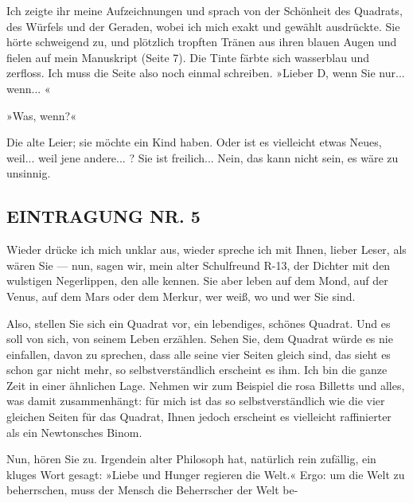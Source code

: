 Ich zeigte ihr meine Aufzeichnungen und sprach von der Schönheit
des Quadrats, des Würfels und der Geraden, wobei ich mich exakt und
gewählt ausdrückte. Sie hörte schweigend zu, und plötzlich tropften
Tränen aus ihren blauen Augen und fielen auf mein Manuskript (Seite
7). Die Tinte färbte sich wasserblau und zerfloss. Ich muss die
Seite also noch einmal schreiben. »Lieber D, wenn Sie nur...
wenn... «

»Was, wenn?«

Die alte Leier; sie möchte ein Kind haben. Oder ist es vielleicht
etwas Neues, weil... weil jene andere... ? Sie ist freilich...
Nein, das kann nicht sein, es wäre zu unsinnig.

\subsection{EINTRAGUNG NR. 5}

Wieder drücke ich mich unklar aus, wieder spreche ich mit Ihnen,
lieber Leser, als wären Sie — nun, sagen wir, mein alter
Schulfreund R-13, der Dichter mit den wulstigen Negerlippen, den
alle kennen. Sie aber leben auf dem Mond, auf der Venus, auf dem
Mars oder dem Merkur, wer weiß, wo und wer Sie sind.

Also, stellen Sie sich ein Quadrat vor, ein lebendiges, schönes
Quadrat. Und es soll von sich, von seinem Leben erzählen. Sehen
Sie, dem Quadrat würde es nie einfallen, davon zu sprechen, dass
alle seine vier Seiten gleich sind, das sieht es schon gar nicht
mehr, so selbstverständlich erscheint es ihm. Ich bin die ganze
Zeit in einer ähnlichen Lage. Nehmen wir zum Beispiel die rosa
Billetts und alles, was damit zusammenhängt: für mich ist das so
selbstverständlich wie die vier gleichen Seiten für das Quadrat,
Ihnen jedoch erscheint es vielleicht raffinierter als ein
Newtonsches Binom.

Nun, hören Sie zu. Irgendein alter Philosoph hat, natürlich rein
zufällig, ein kluges Wort gesagt: »Liebe und Hunger regieren die
Welt.« Ergo: um die Welt zu beherrschen, muss der Mensch die
Beherrscher der Welt be-

